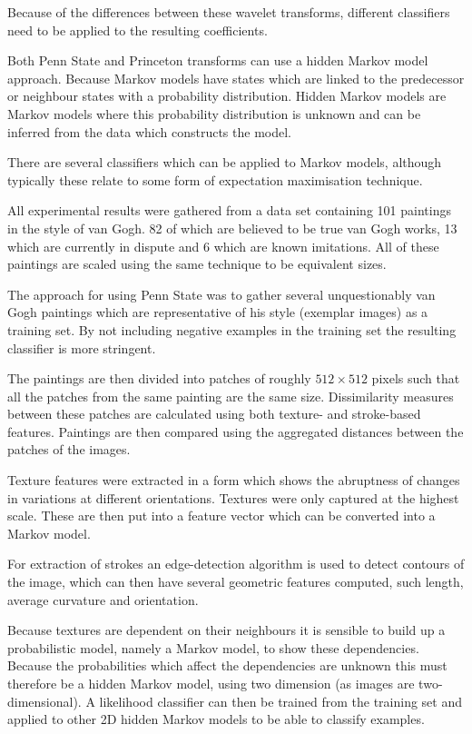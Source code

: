 \documentclass[conference]{IEEEtran}
\begin{document}
Because of the differences between these wavelet transforms, different
classifiers need to be applied to the resulting coefficients.

Both Penn State and Princeton transforms can use a hidden Markov model
approach. Because Markov models have states which are linked to the predecessor
or neighbour states with a probability distribution. Hidden Markov models are
Markov models where this probability distribution is unknown and can be
inferred from the data which constructs the model.

There are several classifiers which can be applied to Markov models, although
typically these relate to some form of expectation maximisation technique.

All experimental results were gathered from a data set containing 101 paintings
in the style of van Gogh. 82 of which are believed to be true van Gogh works,
13 which are currently in dispute and 6 which are known imitations. All of
these paintings are scaled using the same technique to be equivalent sizes.

The approach for using Penn State was to gather several unquestionably van Gogh
paintings which are representative of his style (exemplar images) as a training
set. By not including negative examples in the training set the resulting
classifier is more stringent.

The paintings are then divided into patches of roughly $512 \times 512$ pixels
such that all the patches from the same painting are the same size.
Dissimilarity measures between these patches are calculated using both texture-
and stroke-based features. Paintings are then compared using the aggregated
distances between the patches of the images.

Texture features were extracted in a form which shows the abruptness of changes
in variations at different orientations. Textures were only captured at the
highest scale. These are then put into a feature vector which can be converted
into a Markov model.

For extraction of strokes an edge-detection algorithm is used to detect
contours of the image, which can then have several geometric features computed,
such length, average curvature and orientation.

Because textures are dependent on their neighbours it is sensible to build up a
probabilistic model, namely a Markov model, to show these dependencies. Because
the probabilities which affect the dependencies are unknown this must therefore
be a hidden Markov model, using two dimension (as images are two-dimensional).
A likelihood classifier can then be trained from the training set and applied
to other 2D hidden Markov models to be able to classify examples.
\end{document}
